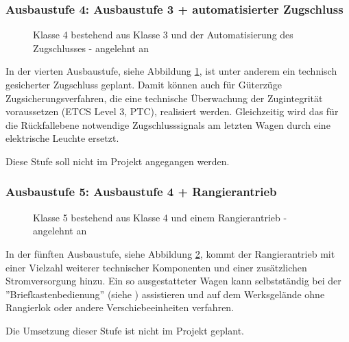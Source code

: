 \subsubsection{Ausbaustufe 4: Ausbaustufe 3 + automatisierter Zugschluss}
\begin{figure}[htbp] 
    
    \caption{Klasse 4 bestehend aus Klasse 3 und der Automatisierung des Zugschlusses - angelehnt an \cite{ETR_3}}
    \label{fig:Klasse4}
\end{figure} 
In der vierten Ausbaustufe, siehe Abbildung \ref{fig:Klasse4}, ist unter anderem ein technisch gesicherter Zugschluss geplant. Damit können auch für Güterzüge Zugsicherungsverfahren, die eine technische Überwachung der Zugintegrität voraussetzen (ETCS Level 3, PTC), realisiert werden. Gleichzeitig wird das für die Rückfallebene notwendige Zugschlusssignals am letzten Wagen durch eine elektrische Leuchte ersetzt.\par
Diese Stufe soll nicht im Projekt angegangen werden.

\subsubsection{Ausbaustufe 5: Ausbaustufe 4 + Rangierantrieb} \label{sec:A5}
\begin{figure}[htbp] 
    
    \caption{Klasse 5 bestehend aus Klasse 4 und einem Rangierantrieb - angelehnt an \cite{ETR_3}}
    \label{fig:Klasse5}
\end{figure}
In der fünften Ausbaustufe, siehe Abbildung \ref{fig:Klasse5}, kommt der Rangierantrieb mit einer Vielzahl weiterer technischer Komponenten und einer zusätzlichen Stromversorgung hinzu. %
Ein so ausgestatteter Wagen kann selbstständig bei der ''Briefkastenbedienung'' (siehe \cite{GAK}) assistieren und auf dem Werksgelände ohne Rangierlok oder andere Verschiebeeinheiten verfahren.\par
Die Umsetzung dieser Stufe ist nicht im Projekt geplant.

